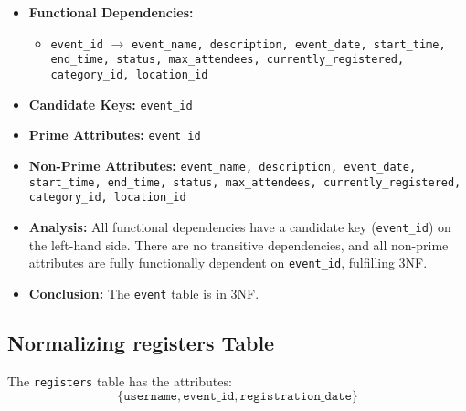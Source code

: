\begin{itemize}
    \item \textbf{Functional Dependencies:}
    \begin{itemize}
        \item \texttt{event\_id} $\rightarrow$ \texttt{event\_name, description, event\_date, start\_time, end\_time, status, max\_attendees, currently\_registered, category\_id, location\_id}
    \end{itemize}

    \item \textbf{Candidate Keys:} \texttt{event\_id}

    \item \textbf{Prime Attributes:} \texttt{event\_id}

    \item \textbf{Non-Prime Attributes:} \texttt{event\_name, description, event\_date, start\_time, end\_time, status, max\_attendees, currently\_registered, category\_id, location\_id}

    \item \textbf{Analysis:} All functional dependencies have a candidate key (\texttt{event\_id}) on the left-hand side. There are no transitive dependencies, and all non-prime attributes are fully functionally dependent on \texttt{event\_id}, fulfilling 3NF.

    \item \textbf{Conclusion:} The \texttt{event} table is in 3NF.
\end{itemize}

\subsection{Normalizing registers Table}

The \texttt{registers} table has the attributes:
\[
\{ \texttt{username}, \texttt{event\_id}, \texttt{registration\_date} \}
\]

